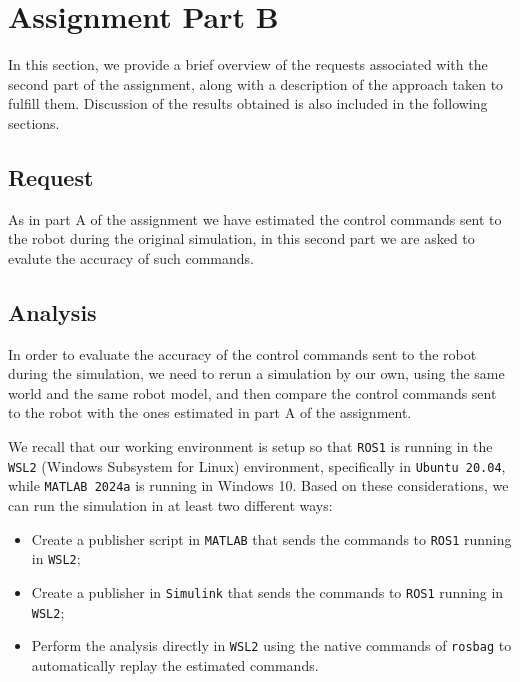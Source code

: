 \section{Assignment Part B}
\label{sec:assignment_part_B}

In this section, we provide a brief overview of the requests associated with the second part of the assignment, along with a description of the approach taken to fulfill them.
Discussion of the results obtained is also included in the following sections.


\subsection{Request}
\label{subsec:request_part_B}

As in part A of the assignment we have estimated the control commands sent to the robot during the original simulation, in this second part we are asked to evalute the accuracy of such commands.



\subsection{Analysis}
\label{subsec:analysis_part_B}

In order to evaluate the accuracy of the control commands sent to the robot during the simulation, we need to rerun a simulation by our own, using the same world and the same robot model, and then compare the control commands sent to the robot with the ones estimated in part A of the assignment.

We recall that our working environment is setup so that \texttt{ROS1} is running in the \texttt{WSL2} (Windows Subsystem for Linux) environment, specifically in \texttt{Ubuntu 20.04}, while \texttt{MATLAB 2024a} is running in Windows 10.
Based on these considerations, we can run the simulation in at least two different ways:

\begin{itemize}
    \item Create a publisher script in \texttt{MATLAB} that sends the commands to \texttt{ROS1} running in \texttt{WSL2};
    \item Create a publisher in \texttt{Simulink} that sends the commands to \texttt{ROS1} running in \texttt{WSL2};
    \item Perform the analysis directly in \texttt{WSL2} using the native commands of \texttt{rosbag} to automatically replay the estimated commands.
\end{itemize}

